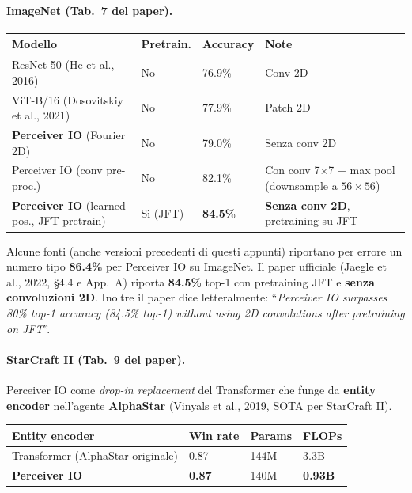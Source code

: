 \documentclass[
  11pt,
]{article}
\begin{document}
\paragraph{ImageNet (Tab.\ 7 del paper).}

{\small
\begin{longtable}{@{}p{5cm} p{2cm} p{2.2cm} p{2cm}@{}}
\toprule
\textbf{Modello} & \textbf{Pretrain.} & \textbf{Accuracy} & \textbf{Note} \\
\midrule
\endhead
ResNet-50 (He et al., 2016) & No & 76.9\% & Conv 2D \\[2pt]
ViT-B/16 (Dosovitskiy et al., 2021) & No & 77.9\% & Patch 2D \\[2pt]
\textbf{Perceiver IO} (Fourier 2D) & No & 79.0\% & Senza conv 2D \\[2pt]
Perceiver IO (conv pre-proc.) & No & 82.1\% & Con conv 7$\times$7 + max pool (downsample a $56\times56$) \\[2pt]
\textbf{Perceiver IO} (learned pos., JFT pretrain) & Sì (JFT) & \textbf{84.5\%} & \textbf{Senza conv 2D}, pretraining su JFT \\
\bottomrule
\end{longtable}
}

\begin{notabox}[title={\textbf{Nota su ``86.4\%'' di ImageNet IO}}]
Alcune fonti (anche versioni precedenti di questi appunti) riportano per errore un numero tipo \textbf{86.4\%} per Perceiver IO su ImageNet. Il paper ufficiale (Jaegle et al., 2022, \S4.4 e App.\ A) riporta \textbf{84.5\%} top-1 con pretraining JFT e \textbf{senza convoluzioni 2D}. Inoltre il paper dice letteralmente: ``\emph{Perceiver IO surpasses 80\% top-1 accuracy (84.5\% top-1) without using 2D convolutions after pretraining on JFT}''.
\end{notabox}

\paragraph{StarCraft II (Tab.\ 9 del paper).} Perceiver IO come \emph{drop-in replacement} del Transformer che funge da \textbf{entity encoder} nell'agente \textbf{AlphaStar} (Vinyals et al., 2019, SOTA per StarCraft II).

{\small
\begin{longtable}{@{}p{3.5cm} p{2cm} p{2cm} p{2cm}@{}}
\toprule
\textbf{Entity encoder} & \textbf{Win rate} & \textbf{Params} & \textbf{FLOPs} \\
\midrule
\endhead
Transformer (AlphaStar originale) & 0.87 & 144M & 3.3B \\[2pt]
\textbf{Perceiver IO} & \textbf{0.87} & 140M & \textbf{0.93B} \\
\bottomrule
\end{longtable}
}
\end{document}
